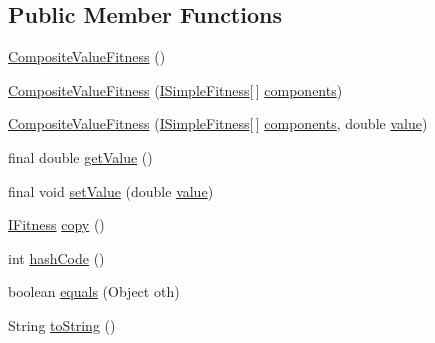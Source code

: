 \subsection*{Public Member Functions}
\begin{DoxyCompactItemize}
\item 
\hyperlink{classnet_1_1sf_1_1jclec_1_1fitness_1_1_composite_value_fitness_a7886c2f50b76ad4433cf2ca7f4fc90b6}{Composite\-Value\-Fitness} ()
\item 
\hyperlink{classnet_1_1sf_1_1jclec_1_1fitness_1_1_composite_value_fitness_a30482c0efc4dbe8b0364bf9c5d79c0a4}{Composite\-Value\-Fitness} (\hyperlink{interfacenet_1_1sf_1_1jclec_1_1fitness_1_1_i_simple_fitness}{I\-Simple\-Fitness}\mbox{[}$\,$\mbox{]} \hyperlink{classnet_1_1sf_1_1jclec_1_1fitness_1_1_composite_fitness_a07576591ce53292c41a9283d0baed349}{components})
\item 
\hyperlink{classnet_1_1sf_1_1jclec_1_1fitness_1_1_composite_value_fitness_a5a712eea27ae7d02c46bd6b30ccf6049}{Composite\-Value\-Fitness} (\hyperlink{interfacenet_1_1sf_1_1jclec_1_1fitness_1_1_i_simple_fitness}{I\-Simple\-Fitness}\mbox{[}$\,$\mbox{]} \hyperlink{classnet_1_1sf_1_1jclec_1_1fitness_1_1_composite_fitness_a07576591ce53292c41a9283d0baed349}{components}, double \hyperlink{classnet_1_1sf_1_1jclec_1_1fitness_1_1_composite_value_fitness_a5b325c383bcdfd09c8277bafe55401bf}{value})
\item 
final double \hyperlink{classnet_1_1sf_1_1jclec_1_1fitness_1_1_composite_value_fitness_ae3bac462e29b62e88ede7d56ead6adf8}{get\-Value} ()
\item 
final void \hyperlink{classnet_1_1sf_1_1jclec_1_1fitness_1_1_composite_value_fitness_a2289464a4aece8cb6d5ea230205e0362}{set\-Value} (double \hyperlink{classnet_1_1sf_1_1jclec_1_1fitness_1_1_composite_value_fitness_a5b325c383bcdfd09c8277bafe55401bf}{value})
\item 
\hyperlink{interfacenet_1_1sf_1_1jclec_1_1_i_fitness}{I\-Fitness} \hyperlink{classnet_1_1sf_1_1jclec_1_1fitness_1_1_composite_value_fitness_a40225c02b3d3a5ad19d43f3e54eeeb20}{copy} ()
\item 
int \hyperlink{classnet_1_1sf_1_1jclec_1_1fitness_1_1_composite_value_fitness_ab3d7f0ec40d8a9887fe612d69e4d5193}{hash\-Code} ()
\item 
boolean \hyperlink{classnet_1_1sf_1_1jclec_1_1fitness_1_1_composite_value_fitness_a6184176b159853a5c86134db808beb9c}{equals} (Object oth)
\item 
String \hyperlink{classnet_1_1sf_1_1jclec_1_1fitness_1_1_composite_value_fitness_a7a8a33e514b00d927165b353b9db3252}{to\-String} ()
\end{DoxyCompactItemize}
